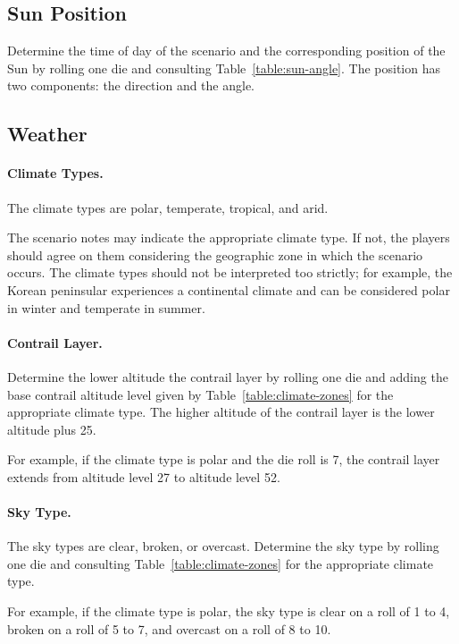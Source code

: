 \begin{advancedrules}
{\subsection{Sun Position}
\label{rule:sun-position}

Determine the time of day of the scenario and the corresponding position of the Sun by rolling one die and consulting Table~\ref{table:sun-angle}. The position has two components: the direction and the angle.

\subsection{Weather}

\paragraph{Climate Types.} The climate types are polar, temperate, tropical, and arid.

The scenario notes may indicate the appropriate climate type. If not, the players should agree on them considering the geographic zone in which the scenario occurs. The climate types should not be interpreted too strictly; for example, the Korean peninsular experiences a continental climate and can be considered polar in winter and temperate in summer.

\paragraph{Contrail Layer.} Determine the lower altitude the contrail layer by rolling one die and adding the base contrail altitude level given by Table~\ref{table:climate-zones} for the appropriate climate type. The higher altitude of the contrail layer is the lower altitude plus 25.

For example, if the climate type is polar and the die roll is 7, the contrail layer extends from altitude level 27 to altitude level 52.

\paragraph{Sky Type.} The sky types are clear, broken, or overcast. Determine the sky type by rolling one die and consulting Table~\ref{table:climate-zones} for the appropriate climate type. 

For example, if the climate type is polar, the sky type is clear on a roll of 1 to 4, broken on a roll of 5 to 7, and overcast on a roll of 8 to 10.

}
\end{advancedrules}
